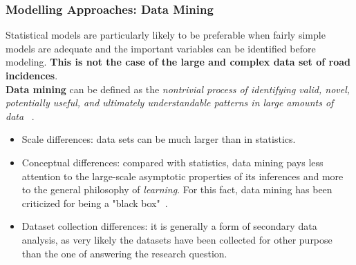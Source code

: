 \documentclass[hyperref={pdfpagelabels=true}]{beamer}
\begin{document}
\begin{frame}
\frametitle{Modelling Approaches: Data Mining}
Statistical models are particularly likely to be preferable when fairly simple models are adequate and the important variables can
be identified before modeling. \textbf{This is not the case of the large and complex data set of road incidences}.\\
\vspace{5mm}%
\textbf{Data mining} can be defined as the \textit{nontrivial process of identifying valid, novel, potentially useful, and ultimately understandable patterns in large amounts of data} ~\cite{sets}.
\small{
\begin{itemize}
\item<1-> Scale differences: data sets can be much larger than in statistics.
\item<2-> Conceptual differences: compared with statistics, data mining pays less attention to the large-scale asymptotic properties of its inferences and more to the general philosophy of \textit{learning}. For this fact, data mining has been criticized for being a "black box"~\cite{zeng}.
\item<3-> Dataset collection differences: it is generally a form of secondary data analysis, as very likely the datasets have been collected for other purpose than the one of answering the research question.
\end{itemize}
}
\end{frame}
\end{document}
